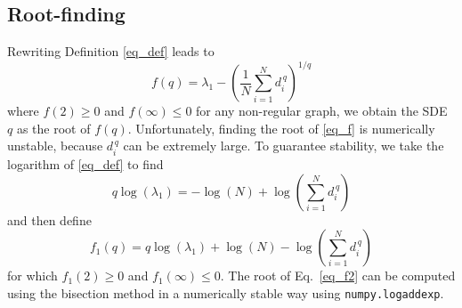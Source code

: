 \documentclass{comnet}%
\begin{document}
\subsection{Root-finding}
Rewriting Definition \eqref{eq_def} leads to
\begin{equation}\label{eq_f}
	f(q) = \lambda_1 - \left( \frac{1}{N} \sum_{i=1}^N d_i^{\, q} \right)^{1/q}
\end{equation}
where $f(2) \geq 0$ and $f(\infty) \leq 0$ for any non-regular graph, we obtain the SDE $q$ as the root of $f(q)$. Unfortunately, finding the root of \eqref{eq_f} is numerically unstable, because $d_i^{\, q}$ can be extremely large. To guarantee stability, we take the logarithm of \eqref{eq_def} to find
\begin{equation*}
	q \log(\lambda_1) = -\log\left( N\right) + \log\left( \sum_{i=1}^N d_i^{\, q} \right)
\end{equation*}
and then define
\begin{equation}\label{eq_f2}
	f_1(q) = q \log(\lambda_1) + \log\left( N\right) - \log\left( \sum_{i=1}^N d_i^{\, q} \right)
\end{equation}
for which $f_1(2) \geq 0$ and $f_1(\infty) \leq 0$. The root of Eq.~\eqref{eq_f2} can be computed using the bisection method in a numerically stable way using \texttt{numpy.logaddexp}.
\end{document}
